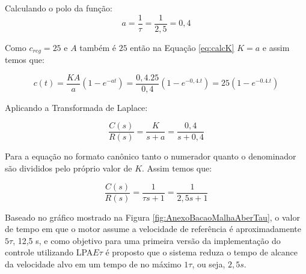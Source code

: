 Calculando o polo da função:
\begin{equation}
  a = \frac{1}{\tau} = \frac{1}{2,5} = 0,4
\end{equation}

Como $c_{reg} = 25$ e $A$ também é $25$ então na Equação \ref{eq:calcK} $K = a$ e assim temos que:

\begin{equation}
c(t) = \frac{KA}{a}(1-e^{-at}) = \frac{0,4.25}{0,4}(1-e^{-0,4.t}) = 25(1-e^{-0.4.t})
\end{equation}


Aplicando a Transformada de Laplace:

\begin{equation}
  \frac{C(s)}{R(s)} = \frac{K}{s+a} = \frac{0,4}{s+0,4}
\end{equation}


Para a equação no formato canônico tanto o numerador quanto o denominador são divididos pelo próprio valor de $K$. Assim temos que:

\begin{equation}
  \frac{C(s)}{R(s)} = \frac{1}{\tau s+1} = \frac{1}{2,5 s+1}
\end{equation}


Baseado no gráfico mostrado na Figura \ref{fig:AnexoBacaoMalhaAberTau}, o valor de tempo em que o motor assume a velocidade de referência é aproximadamente $5\tau$, 12,5 s, e como objetivo para uma primeira versão da implementação do controle utilizando LPA$E\tau$ é proposto que o sistema reduza o tempo de alcance da velocidade alvo em um tempo de no máximo $1\tau$, ou seja, $2,5 s$.



